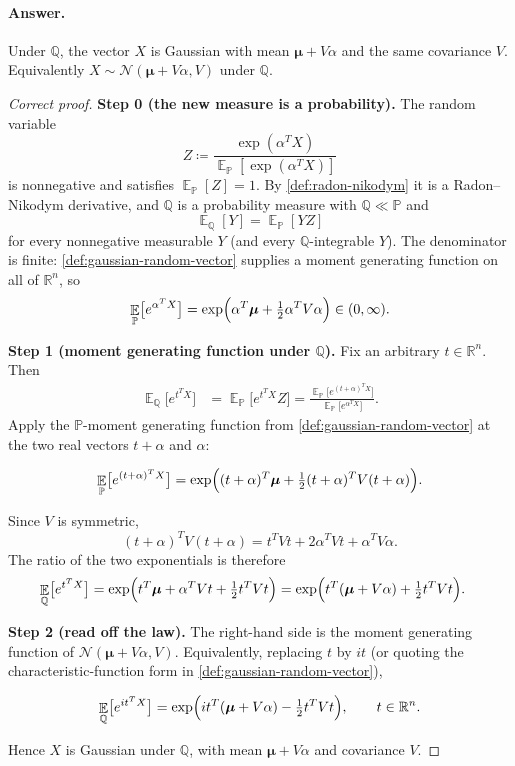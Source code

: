 \documentclass[11pt,a4paper]{article}
\DeclareMathOperator{\E}{\mathbb{E}}
\begin{document}
\paragraph{Answer.}

Under \(\mathbb{Q}\), the vector \(X\) is Gaussian with mean \(\bm{\mu}+V\alpha\) and the same covariance \(V\). Equivalently \(X\sim\mathcal{N}(\bm{\mu}+V\alpha,V)\) under \(\mathbb{Q}\).

\begin{proof}[Correct proof]
\textbf{Step 0 (the new measure is a probability).}
The random variable
\[
Z
\coloneqq
\frac{\exp(\alpha^{T}X)}{\E_{\mathbb{P}}[\exp(\alpha^{T}X)]}
\]
is nonnegative and satisfies \(\E_{\mathbb{P}}[Z]=1\). By \cref{def:radon-nikodym} it is a Radon--Nikodym derivative, and \(\mathbb{Q}\) is a probability measure with \(\mathbb{Q}\ll\mathbb{P}\) and
\[
\E_{\mathbb{Q}}[Y]
=
\E_{\mathbb{P}}[YZ]
\]
for every nonnegative measurable \(Y\) (and every \(\mathbb{Q}\)-integrable \(Y\)). The denominator is finite: \cref{def:gaussian-random-vector} supplies a moment generating function on all of \(\mathbb{R}^{n}\), so
\[
\E_{\mathbb{P}}\bigl[e^{\alpha^{T}X}\bigr]
=
\exp\Bigl(\alpha^{T}\bm{\mu}+\tfrac12\alpha^{T}V\alpha\Bigr)
\in(0,\infty).
\]

\textbf{Step 1 (moment generating function under \(\mathbb{Q}\)).}
Fix an arbitrary \(t\in\mathbb{R}^{n}\). Then
\[
\begin{aligned}
\E_{\mathbb{Q}}\bigl[e^{t^{T}X}\bigr]
&=
\E_{\mathbb{P}}\bigl[e^{t^{T}X}Z\bigr]
=
\frac{\E_{\mathbb{P}}\bigl[e^{(t+\alpha)^{T}X}\bigr]}{\E_{\mathbb{P}}\bigl[e^{\alpha^{T}X}\bigr]}.
\end{aligned}
\]
Apply the \(\mathbb{P}\)-moment generating function from \cref{def:gaussian-random-vector} at the two real vectors \(t+\alpha\) and \(\alpha\):

\[
\E_{\mathbb{P}}\bigl[e^{(t+\alpha)^{T}X}\bigr]
=
\exp\Bigl(
(t+\alpha)^{T}\bm{\mu}
+
\tfrac12(t+\alpha)^{T}V(t+\alpha)
\Bigr).
\]

Since \(V\) is symmetric,
\[
(t+\alpha)^{T}V(t+\alpha)
=
t^{T}Vt
+
2\alpha^{T}Vt
+
\alpha^{T}V\alpha.
\]
The ratio of the two exponentials is therefore
\[
\begin{aligned}
\E_{\mathbb{Q}}\bigl[e^{t^{T}X}\bigr]
&=
\exp\Bigl(
t^{T}\bm{\mu}
+
\alpha^{T}Vt
+
\tfrac12 t^{T}Vt
\Bigr)
=
\exp\Bigl(
t^{T}(\bm{\mu}+V\alpha)
+
\tfrac12 t^{T}Vt
\Bigr).
\end{aligned}
\]

\textbf{Step 2 (read off the law).}
The right-hand side is the moment generating function of \(\mathcal{N}(\bm{\mu}+V\alpha,V)\). Equivalently, replacing \(t\) by \(it\) (or quoting the characteristic-function form in \cref{def:gaussian-random-vector}),

\[
\E_{\mathbb{Q}}\bigl[e^{it^{T}X}\bigr]
=
\exp\Bigl(
it^{T}(\bm{\mu}+V\alpha)
-
\tfrac12 t^{T}Vt
\Bigr),
\qquad
t\in\mathbb{R}^{n}.
\]

Hence \(X\) is Gaussian under \(\mathbb{Q}\), with mean \(\bm{\mu}+V\alpha\) and covariance \(V\).
\end{proof}
\end{document}

